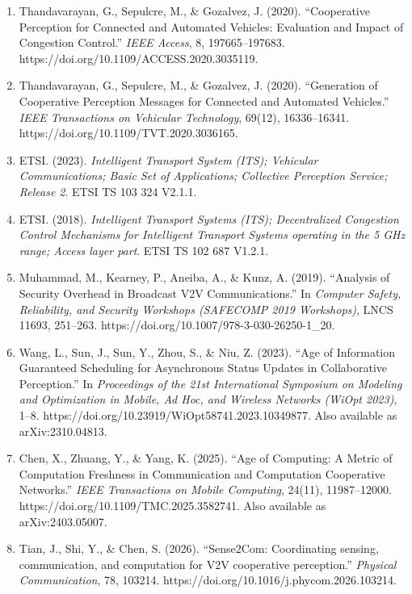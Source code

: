 \documentclass[
]{article}
\providecommand{\tightlist}{%
  \setlength{\itemsep}{0pt}\setlength{\parskip}{0pt}}
\begin{document}
\begin{enumerate}
\def\labelenumi{\arabic{enumi}.}
\tightlist
\item
  Thandavarayan, G., Sepulcre, M., \& Gozalvez, J. (2020). ``Cooperative
  Perception for Connected and Automated Vehicles: Evaluation and Impact
  of Congestion Control.'' \emph{IEEE Access}, 8, 197665--197683.
  https://doi.org/10.1109/ACCESS.2020.3035119.
\item
  Thandavarayan, G., Sepulcre, M., \& Gozalvez, J. (2020). ``Generation
  of Cooperative Perception Messages for Connected and Automated
  Vehicles.'' \emph{IEEE Transactions on Vehicular Technology}, 69(12),
  16336--16341. https://doi.org/10.1109/TVT.2020.3036165.
\item
  ETSI. (2023). \emph{Intelligent Transport System (ITS); Vehicular
  Communications; Basic Set of Applications; Collective Perception
  Service; Release 2}. ETSI TS 103 324 V2.1.1.
\item
  ETSI. (2018). \emph{Intelligent Transport Systems (ITS); Decentralized
  Congestion Control Mechanisms for Intelligent Transport Systems
  operating in the 5 GHz range; Access layer part}. ETSI TS 102 687
  V1.2.1.
\item
  Muhammad, M., Kearney, P., Aneiba, A., \& Kunz, A. (2019). ``Analysis
  of Security Overhead in Broadcast V2V Communications.'' In
  \emph{Computer Safety, Reliability, and Security Workshops (SAFECOMP
  2019 Workshops)}, LNCS 11693, 251--263.
  https://doi.org/10.1007/978-3-030-26250-1\_20.
\item
  Wang, L., Sun, J., Sun, Y., Zhou, S., \& Niu, Z. (2023). ``Age of
  Information Guaranteed Scheduling for Asynchronous Status Updates in
  Collaborative Perception.'' In \emph{Proceedings of the 21st
  International Symposium on Modeling and Optimization in Mobile, Ad
  Hoc, and Wireless Networks (WiOpt 2023)}, 1--8.
  https://doi.org/10.23919/WiOpt58741.2023.10349877. Also available as
  arXiv:2310.04813.
\item
  Chen, X., Zhuang, Y., \& Yang, K. (2025). ``Age of Computing: A Metric
  of Computation Freshness in Communication and Computation Cooperative
  Networks.'' \emph{IEEE Transactions on Mobile Computing}, 24(11),
  11987--12000. https://doi.org/10.1109/TMC.2025.3582741. Also available
  as arXiv:2403.05007.
\item
  Tian, J., Shi, Y., \& Chen, S. (2026). ``Sense2Com: Coordinating
  sensing, communication, and computation for V2V cooperative
  perception.'' \emph{Physical Communication}, 78, 103214.
  https://doi.org/10.1016/j.phycom.2026.103214.

\end{enumerate}
\end{document}
